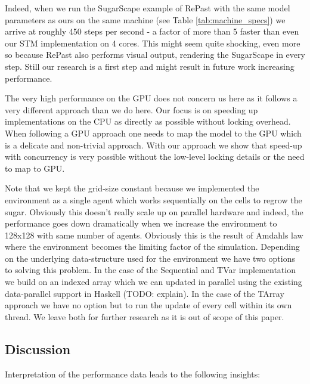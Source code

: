 Indeed, when we run the SugarScape example of RePast with the same model parameters as ours on the same machine (see Table \ref{tab:machine_specs}) we arrive at roughly 450 steps per second - a factor of more than 5 faster than even our STM implementation on 4 cores. This might seem quite shocking, even more so because RePast also performs visual output, rendering the SugarScape in every step. Still our research is a first step and might result in future work increasing performance.

The very high performance on the GPU does not concern us here as it follows a very different approach than we do here. Our focus is on speeding up implementations on the CPU as directly as possible without locking overhead. When following a GPU approach one needs to map the model to the GPU which is a delicate and non-trivial approach. With our approach we show that speed-up with concurrency is very possible without the low-level locking details or the need to map to GPU.

Note that we kept the grid-size constant because we implemented the environment as a single agent which works sequentially on the cells to regrow the sugar. Obviously this doesn't really scale up on parallel hardware and indeed, the performance goes down dramatically when we increase the environment to 128x128 with same number of agents. Obviously this is the result of Amdahls law where the environment becomes the limiting factor of the simulation. Depending on the underlying data-structure used for the environment we have two options to solving this problem. In the case of the Sequential and TVar implementation we build on an indexed array which we can updated in parallel using the existing data-parallel support in Haskell (TODO: explain). In the case of the TArray approach we have no option but to run the update of every cell within its own thread. We leave both for further research as it is out of scope of this paper. 

\subsection{Discussion}
Interpretation of the performance data leads to the following insights:

